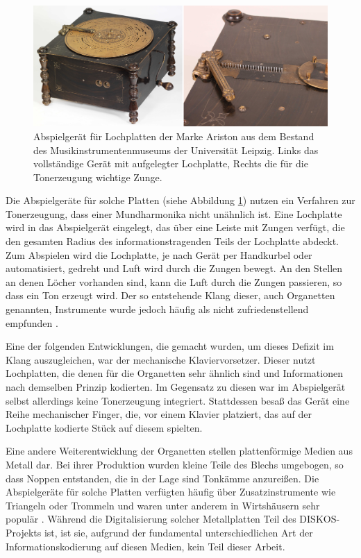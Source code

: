 \begin{figure}[t]
    \centering
    \includegraphics[width=\textwidth]{graphics/ariston_playback_device.png}
    \caption{Abspielgerät für Lochplatten der Marke Ariston aus dem Bestand des Musikinstrumentenmuseums der Universität Leipzig. Links das vollständige Gerät mit aufgelegter Lochplatte, Rechts die für die Tonerzeugung wichtige Zunge.}
    \label{aristonplayer}
\end{figure}

Die Abspielgeräte für solche Platten (siehe Abbildung \ref{aristonplayer}) nutzen ein Verfahren zur Tonerzeugung, dass einer Mundharmonika nicht unähnlich ist.
Eine Lochplatte wird in das Abspielgerät eingelegt, das über eine Leiste mit Zungen verfügt, die den gesamten Radius des informationstragenden Teils der Lochplatte abdeckt.
Zum Abspielen wird die Lochplatte, je nach Gerät per Handkurbel oder automatisiert, gedreht und Luft wird durch die Zungen bewegt.
An den Stellen an denen Löcher vorhanden sind, kann die Luft durch die Zungen passieren, so dass ein Ton erzeugt wird.
Der so entstehende Klang dieser, auch Organetten genannten, Instrumente wurde jedoch häufig als nicht zufriedenstellend empfunden \parencite[III.5.c. Plattenspieldosen und Drehinstrumente]{mgg_mechanische}.

Eine der folgenden Entwicklungen, die gemacht wurden, um dieses Defizit im Klang auszugleichen, war der mechanische Klaviervorsetzer.
Dieser nutzt Lochplatten, die denen für die Organetten sehr ähnlich sind und Informationen nach demselben Prinzip kodierten.
Im Gegensatz zu diesen war im Abspielgerät selbst allerdings keine Tonerzeugung integriert.
Stattdessen besaß das Gerät eine Reihe mechanischer Finger, die, vor einem Klavier platziert, das auf der Lochplatte kodierte Stück auf diesem spielten.

Eine andere Weiterentwicklung der Organetten stellen plattenförmige Medien aus Metall dar.
Bei ihrer Produktion wurden kleine Teile des Blechs umgebogen, so dass Noppen entstanden, die in der Lage sind Tonkämme anzureißen.
Die Abspielgeräte für solche Platten verfügten häufig über Zusatzinstrumente wie Triangeln oder Trommeln und waren unter anderem in Wirtshäusern sehr populär \parencite[III.5.c. Plattenspieldosen und Drehinstrumente]{mgg_mechanische}.
Während die Digitalisierung solcher Metallplatten Teil des DISKOS-Projekts ist, ist sie, aufgrund der fundamental unterschiedlichen Art der Informationskodierung auf diesen Medien, kein Teil dieser Arbeit.

